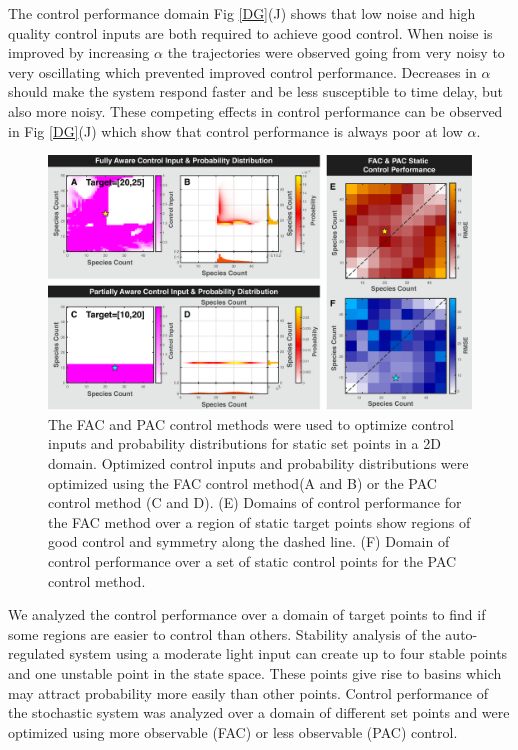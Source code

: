 \documentclass[12pt]{article}
\begin{document}
The control performance domain Fig \ref{DG}(J) shows that low noise and high quality control inputs are both required to achieve good control. When noise is improved by increasing $\alpha$ the trajectories were observed going from very noisy to very oscillating which prevented improved control performance. Decreases in $\alpha$ should make the system respond faster and be less susceptible to time delay, but also more noisy. These competing effects in control performance can be observed in Fig \ref{DG}(J) which show that control performance is always poor at low $\alpha$.


\begin{figure}
\begin{center}
\includegraphics[width=1\textwidth]{StaticControl.pdf}
\vspace{-0.1in}
\caption{The FAC and PAC control methods were used to optimize control inputs and probability distributions for static set points in a 2D domain.  Optimized control inputs and probability distributions were optimized using the FAC control method(A and B) or the PAC control method (C and D). (E) Domains of control performance for the FAC method over a region of static target points show regions of good control and symmetry along the dashed line. (F) Domain of control performance over a set of static control points for the PAC control method.} 
\label{CtrlP}
\end{center}
\vspace{-0.2in}
\end{figure}

We analyzed the control performance over a domain of target points to find if some regions are easier to control than others. Stability analysis of the auto-regulated system using a moderate light input can create up to four stable points and one unstable point in the state space.  These points give rise to basins which may attract probability more easily than other points. Control performance of the stochastic system was analyzed over a domain of different set points and were optimized using more observable (FAC) or less observable (PAC) control.
\end{document}
